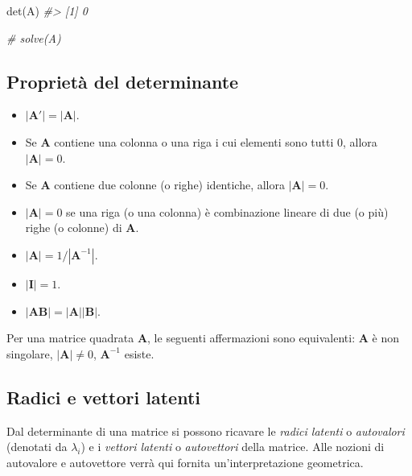 \documentclass[
  11pt,
]{krantz}
\makeatletter
\newenvironment{Shaded}{\begin{snugshade}}{\end{snugshade}}
\newcommand{\CommentTok}[1]{\textcolor[rgb]{0.37,0.37,0.37}{\textit{#1}}}
\newcommand{\FunctionTok}[1]{\textcolor[rgb]{0,0,0}{#1}}
\newcommand{\NormalTok}[1]{#1}
\providecommand{\tightlist}{%
  \setlength{\itemsep}{0pt}\setlength{\parskip}{0pt}}
\newenvironment{kframe}{%
\medskip{}
\setlength{\fboxsep}{.8em}
 \def\at@end@of@kframe{}%
 \ifinner\ifhmode%
  \def\at@end@of@kframe{\end{minipage}}%
  \begin{minipage}{\columnwidth}%
 \fi\fi%
 \def\FrameCommand##1{\hskip\@totalleftmargin \hskip-\fboxsep
 \colorbox{shadecolor}{##1}\hskip-\fboxsep
     \hskip-\linewidth \hskip-\@totalleftmargin \hskip\columnwidth}%
 \MakeFramed {\advance\hsize-\width
   \@totalleftmargin\z@ \linewidth\hsize
   \@setminipage}}%
 {\par\unskip\endMakeFramed%
 \at@end@of@kframe}
\renewenvironment{Shaded}{\begin{kframe}}{\end{kframe}}
\theoremstyle{definition}
\theoremstyle{definition}
\theoremstyle{definition}
\theoremstyle{definition}
\theoremstyle{remark}
\makeatother
\begin{document}
\begin{Shaded}
\begin{Highlighting}[]
\FunctionTok{det}\NormalTok{(A)}
\CommentTok{\#\textgreater{} [1] 0}
\end{Highlighting}
\end{Shaded}

\begin{Shaded}
\begin{Highlighting}[]
\CommentTok{\# solve(A)}
\end{Highlighting}
\end{Shaded}

\hypertarget{proprietuxe0-del-determinante}{%
\subsection{Proprietà del determinante}\label{proprietuxe0-del-determinante}}

\begin{itemize}
\tightlist
\item
  \(|\boldsymbol{A}'| = |\boldsymbol{A}|\).
\item
  Se \(\boldsymbol{A}\) contiene una colonna o una riga i cui elementi sono tutti 0, allora \(|\boldsymbol{A}|=0\).
\item
  Se \(\boldsymbol{A}\) contiene due colonne (o righe) identiche, allora \(|\boldsymbol{A}|=0\).
\item
  \(|\boldsymbol{A}| = 0\) se una riga (o una colonna) è combinazione lineare di due (o più) righe (o colonne) di \(\boldsymbol{A}\).
\item
  \(|\boldsymbol{A}| = 1/|\boldsymbol{A}^{-1}|\).
\item
  \(|\boldsymbol{I}| = 1\).
\item
  \(|\boldsymbol{A} \boldsymbol{B}| = |\boldsymbol{A}| |\boldsymbol{B}|\).
\end{itemize}

Per una matrice quadrata \(\boldsymbol{A}\), le seguenti affermazioni sono equivalenti: \(\boldsymbol{A}\) è non singolare, \(|\boldsymbol{A}|\neq 0\), \(\boldsymbol{A}^{-1}\) esiste.

\hypertarget{radici-e-vettori-latenti}{%
\subsection{Radici e vettori latenti}\label{radici-e-vettori-latenti}}

Dal determinante di una matrice si possono ricavare le \emph{radici latenti} o \emph{autovalori} (denotati da \(\lambda_i\)) e i \emph{vettori latenti} o \emph{autovettori} della matrice. Alle nozioni di autovalore e autovettore verrà qui fornita un'interpretazione geometrica.
\end{document}
